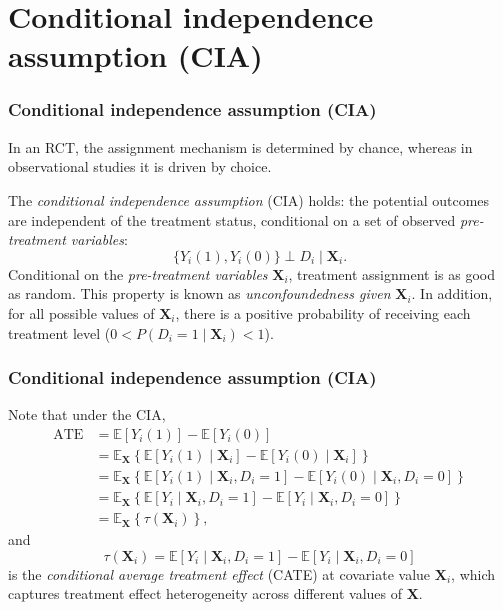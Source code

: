 \documentclass[12pt, compress]{beamer}
\begin{document}
\section{Conditional independence assumption (CIA)}
\begin{frame}
	\frametitle{Conditional independence assumption (CIA)}
In an RCT, the assignment mechanism is determined by chance, whereas in observational studies it is driven by choice.

The \textit{conditional independence assumption} (CIA) holds: the potential outcomes are independent of the treatment status, conditional on a set of observed  \textit{pre-treatment variables}:
\[
\{ Y_i(1), Y_i(0) \} \perp D_i \mid \mathbf{X}_i.
\]
Conditional on the \textit{pre-treatment variables} $\mathbf{X}_i$, treatment assignment is as good as random. This property is known as \textit{unconfoundedness given} $\mathbf{X}_i$. In addition, for all possible values of $\mathbf{X}_i$, there is a positive probability of receiving each treatment level ($0 < P(D_i = 1 \mid \mathbf{X}_i) < 1$).
\end{frame}

\begin{frame}
	\frametitle{Conditional independence assumption (CIA)}
Note that under the CIA,
\begin{align*}
	\text{ATE} &= \mathbb{E}[Y_i(1)] - \mathbb{E}[Y_i(0)] \\
	&= \mathbb{E}_{\mathbf{X}}\left\{ \mathbb{E}[Y_i(1)\mid \mathbf{X}_i] - \mathbb{E}[Y_i(0)\mid \mathbf{X}_i] \right\} \\
	&= \mathbb{E}_{\mathbf{X}}\left\{ \mathbb{E}[Y_i(1)\mid \mathbf{X}_i, D_i=1] - \mathbb{E}[Y_i(0)\mid \mathbf{X}_i, D_i=0] \right\} \\
	&= \mathbb{E}_{\mathbf{X}}\left\{ \mathbb{E}[Y_i\mid \mathbf{X}_i, D_i=1] - \mathbb{E}[Y_i\mid \mathbf{X}_i, D_i=0] \right\} \\
	&= \mathbb{E}_{\mathbf{X}}\left\{ \tau(\mathbf{X}_i) \right\},
\end{align*}
and
\[
\tau(\mathbf{X}_i) = \mathbb{E}[Y_i \mid \mathbf{X}_i, D_i=1] - \mathbb{E}[Y_i \mid \mathbf{X}_i, D_i=0]
\]
is the \textit{conditional average treatment effect} (CATE) at covariate value $\mathbf{X}_i$, which captures treatment effect heterogeneity across different values of $\mathbf{X}$.
\end{frame}
\end{document}
